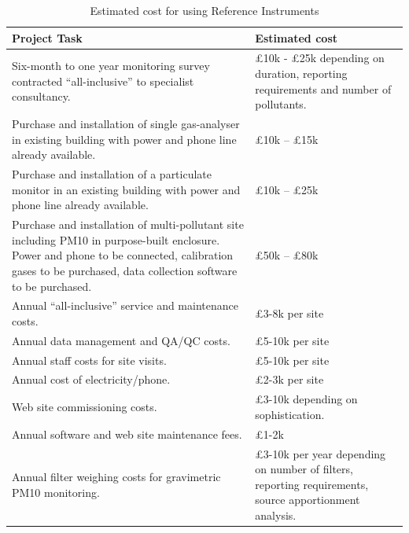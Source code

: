 \begin{table}[h]
  
  
    \begin{tabularx}{\columnwidth}{X|X}
        \hline
        Project Task            & Estimated cost    \\
        \hline
        Six-month to one year monitoring survey contracted “all-inclusive” to specialist consultancy.   &  £10k - £25k depending on duration, reporting requirements and number of pollutants.\\ \hline


        Purchase and installation of single gas-analyser
        in existing building with power and phone line
        already available.  & £10k – £15k  \\ \hline
        Purchase and installation of a particulate
        monitor in an existing building with power and
        phone line already available.  & £10k – £25k \\ \hline
       Purchase and installation of multi-pollutant site including PM10 in purpose-built enclosure. Power and phone to be connected, calibration gases to be purchased, data collection software to be purchased.      & £50k – £80k \\ \hline

        Annual “all-inclusive” service and maintenance costs.  & £3-8k per site        \\ \hline
        
        
        Annual data management and QA/QC costs.  & £5-10k per site     \\ \hline
        Annual staff costs for site visits.  & £5-10k per site      \\ \hline
        Annual cost of electricity/phone. & £2-3k per site \\ \hline
        Web site commissioning costs.   & £3-10k depending on sophistication.         \\ \hline
        Annual software and web site maintenance fees.   & £1-2k  \\ \hline
        Annual filter weighing costs for gravimetric PM10 monitoring. & £3-10k per year depending on number of filters, reporting requirements, source apportionment analysis. \\ 
        \hline
      
    \end{tabularx}
    \caption{Estimated cost for using Reference Instruments}
    \label{table:cost}
  \end{table}









